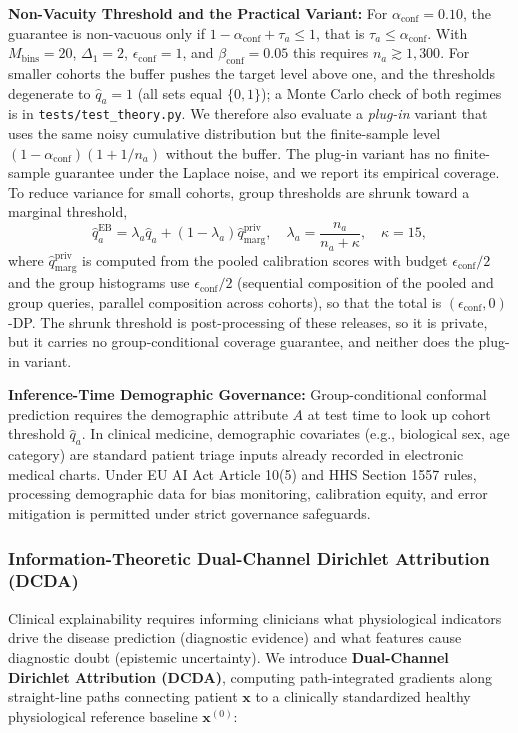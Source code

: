 \documentclass[pdflatex,sn-vancouver-num,referee,lineno]{sn-jnl}
\theoremstyle{thmstyleone}
\theoremstyle{thmstylethree}
\begin{document}
\noindent \textbf{Non-Vacuity Threshold and the Practical Variant:} For $\alpha_{\text{conf}} = 0.10$, the guarantee is non-vacuous only if $1 - \alpha_{\text{conf}} + \tau_a \le 1$, that is $\tau_a \le \alpha_{\text{conf}}$. With $M_{\text{bins}} = 20$, $\Delta_1 = 2$, $\epsilon_{\text{conf}} = 1$, and $\beta_{\text{conf}} = 0.05$ this requires $n_a \gtrsim 1{,}300$. For smaller cohorts the buffer pushes the target level above one, and the thresholds degenerate to $\hat{q}_a = 1$ (all sets equal $\{0,1\}$); a Monte Carlo check of both regimes is in \texttt{tests/test\_theory.py}. We therefore also evaluate a \emph{plug-in} variant that uses the same noisy cumulative distribution but the finite-sample level $(1-\alpha_{\text{conf}})(1 + 1/n_a)$ without the buffer. The plug-in variant has no finite-sample guarantee under the Laplace noise, and we report its empirical coverage. To reduce variance for small cohorts, group thresholds are shrunk toward a marginal threshold,
\begin{equation}
    \hat{q}_a^{\text{EB}} = \lambda_a \hat{q}_a + (1 - \lambda_a) \hat{q}_{\text{marg}}^{\text{priv}}, \quad \lambda_a = \frac{n_a}{n_a + \kappa}, \quad \kappa = 15,
\end{equation}
where $\hat{q}_{\text{marg}}^{\text{priv}}$ is computed from the pooled calibration scores with budget $\epsilon_{\text{conf}}/2$ and the group histograms use $\epsilon_{\text{conf}}/2$ (sequential composition of the pooled and group queries, parallel composition across cohorts), so that the total is $(\epsilon_{\text{conf}}, 0)$-DP. The shrunk threshold is post-processing of these releases, so it is private, but it carries no group-conditional coverage guarantee, and neither does the plug-in variant.

\noindent \textbf{Inference-Time Demographic Governance:} Group-conditional conformal prediction requires the demographic attribute $A$ at test time to look up cohort threshold $\hat{q}_a$. In clinical medicine, demographic covariates (e.g., biological sex, age category) are standard patient triage inputs already recorded in electronic medical charts. Under EU AI Act Article 10(5) and HHS Section 1557 rules, processing demographic data for bias monitoring, calibration equity, and error mitigation is permitted under strict governance safeguards.

\subsubsection{Information-Theoretic Dual-Channel Dirichlet Attribution (DCDA)}
Clinical explainability requires informing clinicians what physiological indicators drive the disease prediction (diagnostic evidence) and what features cause diagnostic doubt (epistemic uncertainty). We introduce \textbf{Dual-Channel Dirichlet Attribution (DCDA)}, computing path-integrated gradients along straight-line paths connecting patient $\mathbf{x}$ to a clinically standardized healthy physiological reference baseline $\mathbf{x}^{(0)}$:
\end{document}
